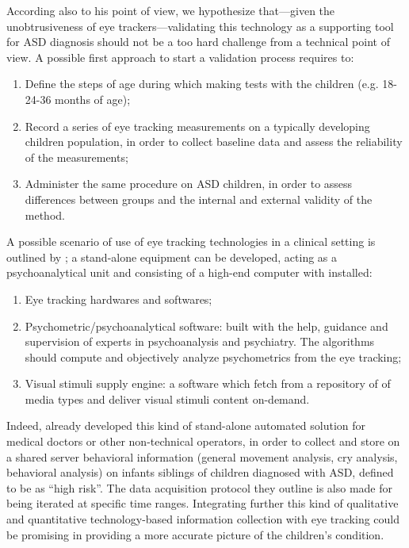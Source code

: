 According also to his point of view, we hypothesize that—given the unobtrusiveness of eye trackers—validating this technology as a supporting tool for ASD diagnosis should not be a too hard challenge from a technical point of view. A possible first approach to start a validation process requires to:
\begin{enumerate}
    \item Define the steps of age during which making tests with the children (e.g. 18-24-36 months of age);
    \item Record a series of eye tracking measurements on a typically developing children population, in order to collect baseline data and assess the reliability of the measurements;
    \item Administer the same procedure on ASD children, in order to assess differences between groups and the internal and external validity of the method.
\end{enumerate}
A possible scenario of use of eye tracking technologies in a clinical setting is outlined by \cite{subrahmaniam2013animation}; a stand-alone equipment can be developed, acting as a psychoanalytical unit and consisting of a high-end computer with installed:
\begin{enumerate}
    \item Eye tracking hardwares and softwares;
    \item Psychometric/psychoanalytical software: built with the help, guidance and supervision of experts in psychoanalysis and psychiatry. The algorithms should compute and objectively analyze psychometrics from the eye tracking;
    \item Visual stimuli supply engine: a software which fetch from a repository of of media types and deliver visual stimuli content on-demand.
\end{enumerate}
Indeed, \cite{bocchi2012earlydiagnosis} already developed this kind of stand-alone automated solution for medical doctors or other non-technical operators, in order to collect and store on a shared server behavioral information (general movement analysis, cry analysis, behavioral analysis) on infants siblings of children diagnosed with ASD, defined to be as “high risk”. The data acquisition protocol they outline is also made for being iterated at specific time ranges. Integrating further this kind of qualitative and quantitative technology-based information collection with eye tracking could be promising in providing a more accurate picture of the children’s condition.

